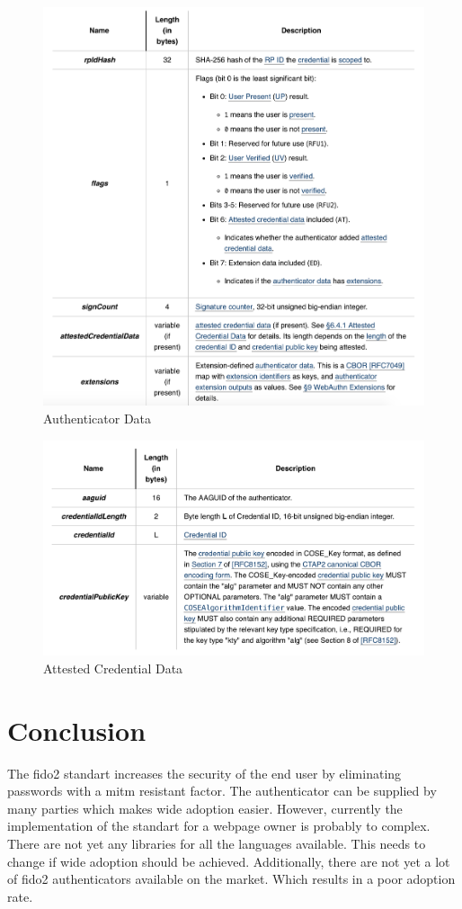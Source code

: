 \documentclass[a4paper, 11pt]{scrartcl}
\begin{document}
\begin{figure}[ht]
  \includegraphics[width=12cm]{img/authenticatorResponseData.png}
  \centering
  \caption{Authenticator Data}
  \label{fig:authenticatorData}
\end{figure}

\begin{figure}[ht]
  \includegraphics[width=12cm]{img/authenticatorData.png}
  \centering
  \caption{Attested Credential Data}
  \label{fig:credentialData}
\end{figure}



\section{Conclusion}
The \gls{fido2} standart increases the security of the end user by eliminating passwords with a \gls{mitm} resistant factor. The authenticator can be supplied by many parties which makes wide adoption easier. However, currently the implementation of the standart for a webpage owner is probably to complex. There are not yet any libraries for all the languages available. This needs to change if wide adoption should be achieved. Additionally, there are not yet a lot of \gls{fido2} authenticators available on the market. Which results in a poor adoption rate. 
\end{document}
